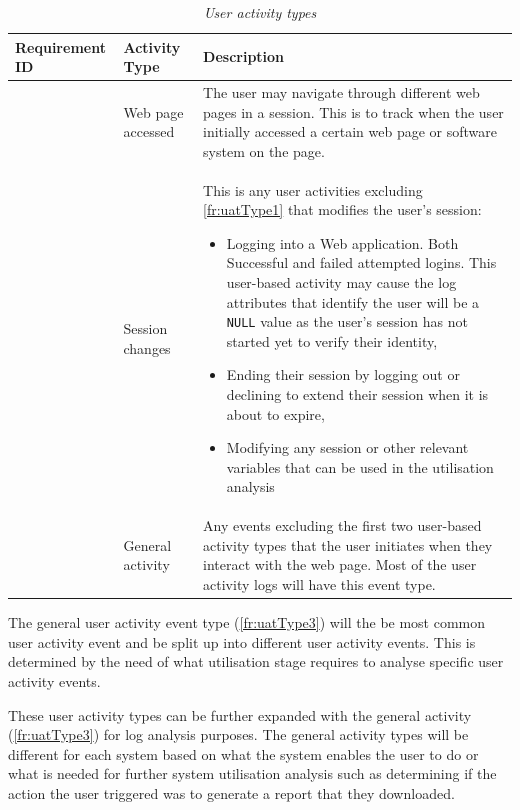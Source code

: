 \begin{table}[!htb]
	\centering
	\caption[User activity types]
	{\textit{User activity types}}
	\label{tbl:ch2_userActivityTypes}
	\begin{tabularx}{\textwidth}{|l|l|X|}
		\hline \textbf{Requirement ID} & \textbf{Activity Type} & \textbf{Description} \\
		\hline \subsubphase{fr:uatType1} & Web page accessed & The user may navigate through different web pages in a session. This is to track when the user initially accessed a certain web page or software system on the page.\\
		\hline \subsubphase{fr:uatType2} & Session changes & This is any user activities excluding \ref{fr:uatType1} that modifies the user's session:
		\begin{itemize}
			\item Logging into a Web application. Both Successful and failed attempted logins. This user-based activity may cause the log attributes that identify the user will be a \texttt{NULL} value as the user's session has not started yet to verify their identity,
			\item Ending their session by logging out or declining to extend their session when it is about to expire,
			\item Modifying any session or other relevant variables that can be used in the utilisation analysis
		\end{itemize}\\
		\hline \subsubphase{fr:uatType3} & General activity & Any events excluding the first two user-based activity types that the user initiates when they interact with the web page. Most of the user activity logs will
		have this event type.\\ 
		\hline
	\end{tabularx}
\end{table}

The general user activity event type (\ref{fr:uatType3}) will the be most common user activity event and be split up into different user activity events. This is determined by the need of what utilisation stage requires to analyse specific user activity events. \par These user activity types can be further expanded with the general activity (\ref{fr:uatType3}) for log analysis purposes. The general activity types will be different for each system based on what the system enables the user to do or what is needed for further system utilisation analysis such as determining if the action the user triggered was to generate a report that they downloaded.

